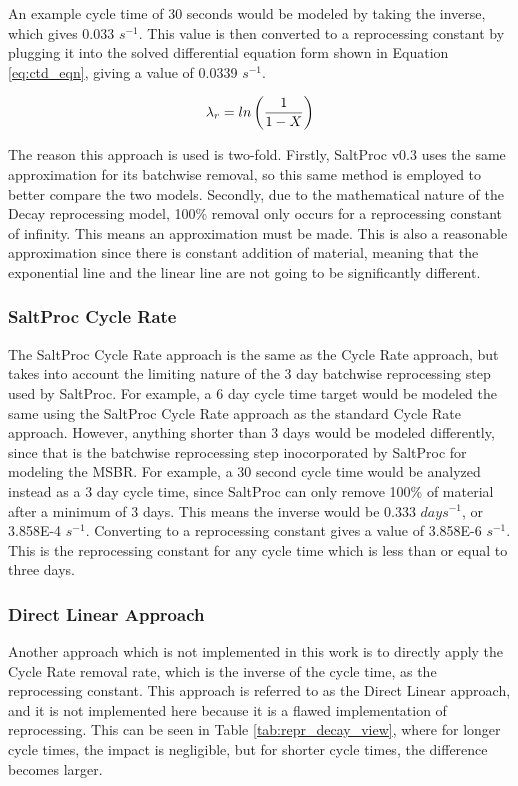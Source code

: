 An example cycle time of 30 seconds would be modeled by taking the inverse, which gives 0.033 $s^{-1}$. This value is then converted to a reprocessing constant by plugging it into the solved differential equation form shown in Equation \eqref{eq:ctd_eqn}, giving a value of 0.0339 $s^{-1}$.

\begin{equation} \hfill
\lambda_{r} = ln\left(\frac{1}{1 - X}\right)
\hfill\label{eq:cr_eqn} \end{equation}

The reason this approach is used is two-fold. Firstly, SaltProc v0.3 uses the same approximation for its batchwise removal, so this same method is employed to better compare the two models. Secondly, due to the mathematical nature of the Decay reprocessing model, 100\% removal only occurs for a reprocessing constant of infinity. This means an approximation must be made. This is also a reasonable approximation since there is constant addition of material, meaning that the exponential line and the linear line are not going to be significantly different.


\subsubsection{SaltProc Cycle Rate}

The SaltProc Cycle Rate approach is the same as the Cycle Rate approach, but takes into account the limiting nature of the 3 day batchwise reprocessing step used by SaltProc. For example, a 6 day cycle time target would be modeled the same using the SaltProc Cycle Rate approach as the standard Cycle Rate approach. However, anything shorter than 3 days would be modeled differently, since that is the batchwise reprocessing step inocorporated by SaltProc for modeling the MSBR. For example, a 30 second cycle time would be analyzed instead as a 3 day cycle time, since SaltProc can only remove 100\% of material after a minimum of 3 days. This means the inverse would be 0.333 $days^{-1}$, or 3.858E-4 $s^{-1}$. Converting to a reprocessing constant gives a value of 3.858E-6 $s^{-1}$. This is the reprocessing constant for any cycle time which is less than or equal to three days.

\subsubsection{Direct Linear Approach}

Another approach which is not implemented in this work is to directly apply the Cycle Rate removal rate, which is the inverse of the cycle time, as the reprocessing constant. This approach is referred to as the Direct Linear approach, and it is not implemented here because it is a flawed implementation of reprocessing. This can be seen in Table \ref{tab:repr_decay_view}, where for longer cycle times, the impact is negligible, but for shorter cycle times, the difference becomes larger.

